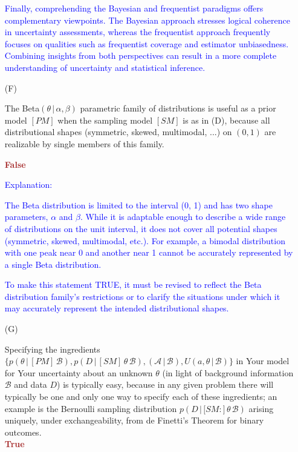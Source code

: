 \documentclass[12pt]{article}
\newcommand{\given}{\, | \,}
\begin{document}
\begin{itemize}
\textcolor{blue}{Finally, comprehending the Bayesian and frequentist paradigms offers complementary viewpoints. The Bayesian approach stresses logical coherence in uncertainty assessments, whereas the frequentist approach frequently focuses on qualities such as frequentist coverage and estimator unbiasedness. Combining insights from both perspectives can result in a more complete understanding of uncertainty and statistical inference.}




\item[(F)]

The Beta$( \theta \given \alpha, \beta )$ parametric family of distributions is
useful as a prior model $[ PM ]$ when the sampling model $[ SM ]$ is as in
(D), because all distributional shapes (symmetric, skewed, multimodal, ...)
on $( 0, 1 )$ are realizable by single members of this family.

\textcolor{brown}{\textbf{False}}

\textcolor{blue}{Explanation:}

\textcolor{blue}{The Beta distribution is limited to the interval (0, 1) and has two shape parameters, $\alpha$ and $\beta$. While it is adaptable enough to describe a wide range of distributions on the unit interval, it does not cover all potential shapes (symmetric, skewed, multimodal, etc.). For example, a bimodal distribution with one peak near 0 and another near 1 cannot be accurately represented by a single Beta distribution.}

\textcolor{blue}{To make this statement TRUE, it must be revised to reflect the Beta distribution family's restrictions or to clarify the situations under which it may accurately represent the intended distributional shapes.}


\item[(G)]

Specifying the ingredients $\{ p ( \theta \given [ PM ] \, \mathcal { B } ), p ( D \given
[ SM ] \, \theta \, { \mathcal B } ), ( { \mathcal A \given { \mathcal B } } ), U ( a, \theta \given { \mathcal B } ) \}$ in Your model for Your uncertainty about an unknown $\theta$ (in light of background information $\mathcal B$ and data $D$) is typically easy, because in any given problem there will typically be one and only one way to specify each of these ingredients; an example is the Bernoulli sampling distribution $p ( D \given [ SM \! : \mathbb ] \, \theta \, { \mathcal B } )$ arising uniquely, under exchangeability, from de Finetti's Theorem for binary outcomes. \\ \textcolor{brown}{\textbf{True}}


\end{itemize}
\end{document}
